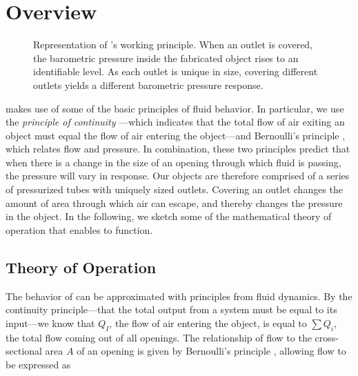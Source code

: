 		\section{\at Overview}
			\begin{figure}[h]
				\centering
				\label{fig:bunny-touches}

				\caption{Representation of \at's working principle. When an outlet is
					covered, the barometric pressure inside the fabricated object rises to an
					identifiable level. As each outlet is unique in size, covering different
					outlets yields a different barometric pressure response.}
			\end{figure}

			\at makes use of some of the basic principles of fluid behavior. In
			particular, we use the \textit{principle of continuity}
			\cite{Rieutord:2015iw}---which indicates that the total flow of air exiting
			an object must equal the flow of air entering the object---and Bernoulli's
			principle \cite{bernoulli1738hydrodynamica}, which relates flow and
			pressure. In combination, these two principles predict that when there is a
			change in the size of an opening through which fluid is passing, the
			pressure will vary in response. Our objects are therefore comprised of a
			series of pressurized tubes with uniquely sized outlets. Covering an outlet
			changes the amount of area through which air can escape, and thereby changes
			the pressure in the object. In the following, we sketch some of the
			mathematical theory of operation that enables \at to function.

			\subsection{Theory of Operation}
				The behavior of \at can be approximated with principles from fluid
				dynamics. By the continuity principle---that the total output from a
				system must be equal to its input---we know that $Q_I$, the flow of air
				entering the object, is equal to $\sum Q_i$, the total flow coming out of
				all openings. The relationship of flow to the cross-sectional area $A$ of
				an opening is given by Bernoulli's principle \cite{Rieutord:2015iw},
				allowing flow to be expressed as

